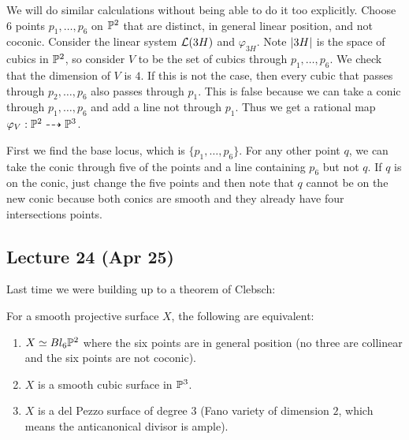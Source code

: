\documentclass[twoside, 10pt]{article}
\begin{document}
        \begin{exm}
            We will do similar calculations without being able to do it too explicitly. Choose $6$ points $p_1, \ldots, p_6$ on $\P^2$ that are distinct, in general linear position, and not coconic. Consider the linear system $\mc{L}(3H)$ and $\varphi_{3H}$. Note $\abs{3H}$ is the space of cubics in $\P^2$, so consider $V$ to be the set of cubics through $p_1, \ldots, p_6$. We check that the dimension of $V$ is $4$. If this is not the case, then every cubic that passes through $p_2, \ldots, p_6$ also passes through $p_1$. This is false because we can take a conic through $p_1, \ldots, p_6$ and add a line not through $p_1$. Thus we get a rational map $\varphi_V: \P^2 \dashrightarrow \P^3$.

            First we find the base locus, which is $\{p_1, \ldots, p_6\}$. For any other point $q$, we can take the conic through five of the points and a line containing $p_6$ but not $q$. If $q$ is on the conic, just change the five points and then note that $q$ cannot be on the new conic because both conics are smooth and they already have four intersections points.
        \end{exm}

        \subsection{Lecture 24 (Apr 25)}
        Last time we were building up to a theorem of Clebsch:
        \begin{thm}[Clebsch]
            For a smooth projective surface $X$, the following are equivalent:
            \begin{enumerate}
                \item $X \simeq Bl_6\P^2$ where the six points are in general position (no three are collinear and the six points are not coconic).
                \item $X$ is a smooth cubic surface in $\P^3$.
                \item $X$ is a del Pezzo surface of degree $3$ (Fano variety of dimension $2$, which means the anticanonical divisor is ample).
            \end{enumerate}
        \end{thm}
\end{document}
